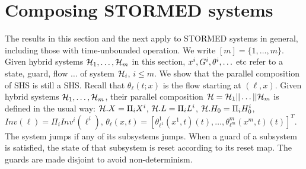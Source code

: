 \section{Composing STORMED systems}
\label{sec:compositionality}
The results in this section and the next apply to STORMED systems in general, including those with time-unbounded operation.
We write $[m] = \{1,\ldots,m\}$.
Given hybrid systems $\mathcal{H}_1,\ldots,\mathcal{H}_m$ in this section, $x^i, G^i, \theta^i,\ldots$ etc refer to a state, guard, flow $\ldots$ of system $\mathcal{H}_i$, $i\leq m$.
%
We show that the parallel composition of SHS is still a SHS.
Recall that $\theta_{\ell}(t;x)$ is the flow starting at $(\ell,x)$.
Given hybrid systems $\mathcal{H}_1,\ldots,\mathcal{H}_m$, their parallel composition $\mathcal{H} = \mathcal{H}_1 || \ldots ||\mathcal{H}_m$ is defined in the usual way:
$\mathcal{H}.X = \Pi_i X^i$,
$\mathcal{H}.L = \Pi_i L^i$,
$\mathcal{H}.H_0 =\Pi_i H_0^i$,
$Inv(\ell) = \Pi_{i}Inv^i(\ell^i)$,
$\theta_{\ell}(x,t)= [\theta_{\ell^1}^1(x^1,t)(t),\ldots,\theta_{\ell^m}^m(x^m,t)(t) ]^T$.
The system jumps if any of its subsystems jumps.
When a guard of a subsystem is satisfied, the state of that subsystem is reset according to its reset map.
The guards are made disjoint to avoid non-determinism.

